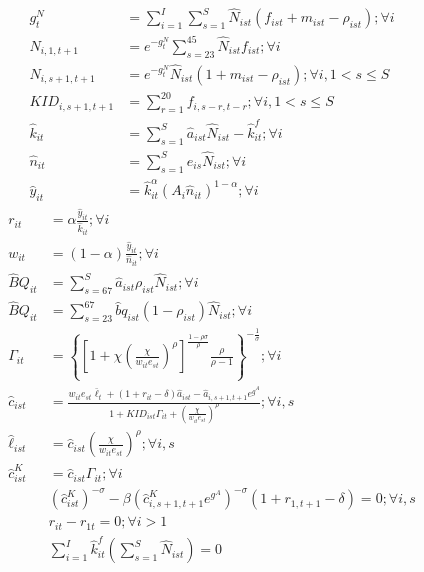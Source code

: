 \documentclass[letterpaper,12pt]{article}
\theoremstyle{definition}
\numberwithin{equation}{section}
\begin{document}
\begin{spacing}{1.5}
	\begin{align}
		g^N_t & = \sum_{i=1}^I \sum_{s=1}^S \hat N_{ist} (f_{ist}+m_{ist}-\rho_{ist}) ; \forall i\\
		\hat N_{i,1,t+1} & = e^{-g^N_t}\sum_{s=23}^{45} \hat N_{ist} f_{ist} ; \forall i\\
		\hat N_{i,s+1,t+1} & = e^{-g^N_t}\hat N_{ist} (1+m_{ist}-\rho_{ist}); \forall i, 1<s\le S \\
		KID_{i,s+1,t+1} & = \sum_{r=1}^{20} f_{i,s-r,t-r}; \forall i, 1<s\le S \\
		\hat k_{it} & = \sum_{s=1}^S \hat a_{ist} \hat N_{ist} - \hat k_{it}^f; \forall i \\
		\hat n_{it} & = \sum_{s=1}^S e_{is} \hat N_{ist}; \forall i \\
		\hat y_{it} & = \hat k_{it}^\alpha \left( A_{i} \hat n_{it} \right)^{1-\alpha} ; \forall i 
	\end{align}
	\begin{align}
		r_{it} & = \alpha \frac{\hat y_{it}}{\hat k_{it}}; \forall i \\
		w_{it} & = (1-\alpha) \frac{\hat y_{it}}{\hat n_{it}}; \forall i \\
		\hat BQ_{it} & = \sum_{s=67}^S \hat a_{ist} \rho_{ist} \hat N_{ist} ; \forall i \\
		\hat BQ_{it} & = \sum_{s=23}^{67} \hat bq_{ist} (1-\rho_{ist}) \hat N_{ist}	; \forall i \\
		\Gamma_{it} & = \left\{ \left[1 + \chi \left(\frac{\chi}{w_{it} e_{st}}\right)^\rho\right]^{\tfrac{1-\rho \sigma}{\rho}} \frac{\rho}{\rho-1} \right\}^{-\tfrac{1}{\sigma}}; \forall i \\
    	\hat c_{ist} & = \frac{w_{it} e_{st} \bar \ell_t + (1+r_{it}-\delta)\hat a_{ist} - \hat a_{i,s+1,t+1} e^{g^A}} {1 + KID_{ist}\Gamma_{it} + \left(\tfrac{\chi}{w_{it}e_{st}}\right)^\rho}; \forall i,s \\
		\hat \ell_{ist} & = \hat c_{ist} \left(\frac{\chi}{w_{it}e_{st}}\right)^\rho ; \forall i,s \\
		\hat c^K_{ist} & = \hat c_{ist} \Gamma_{it}; \forall i \\
		& \left({\hat c^K_{ist}}\right)^{-\sigma} - \beta \left(\hat c^K_{i,s+1,t+1} e^{g^A}\right)^{-\sigma}(1+r_{1,t+1}-\delta) = 0; \forall i,s \\
		& r_{it} - r_{1t} = 0; \forall i>1 \\
		& \sum_{i=1}^I \hat k^f_{it} \left( \sum_{s=1}^S \hat N_{ist} \right) = 0
	\end{align}


\end{spacing}
\end{document}

